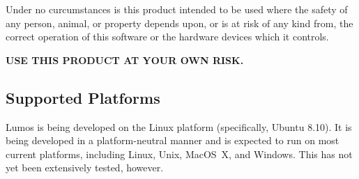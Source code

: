 \documentclass{article}
\begin{document}
Under no curcumstances is this product intended to be used where the
safety of any person, animal, or property depends upon, or is at
risk of any kind from, the correct operation of this software or
the hardware devices which it controls.

{\bf USE THIS PRODUCT AT YOUR OWN RISK.}

\subsection{Supported Platforms}
Lumos is being developed on the Linux platform (specifically, Ubuntu 8.10).
It is being developed in a platform-neutral manner and is expected to run on
most current platforms, including Linux, Unix, MacOS~X, and Windows.  This
has not yet been extensively tested, however.
\end{document}

